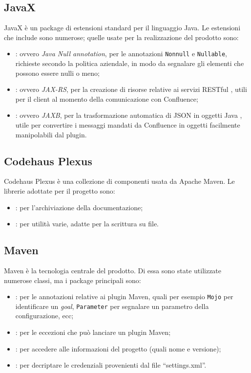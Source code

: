 \subsection{JavaX}
JavaX è un package di estensioni standard per il linguaggio Java.
Le estensioni che include sono numerose; quelle usate per la realizzazione del prodotto sono:
\begin{itemize}
    \item {}: ovvero \emph{Java Null annotation}, per le annotazioni  \texttt{Nonnull} e  \texttt{Nullable}, richieste secondo la politica aziendale, in modo da segnalare gli elementi che possono essere nulli o meno;
    \item {}: ovvero \emph{JAX-RS}, per la creazione di risorse relative ai servizi RESTful \cite{site:jax-rs}, utili per il client al momento della comunicazione con Confluence;
    \item {}: ovvero \emph{JAXB}, per la trasformazione automatica di JSON in oggetti Java \cite{site:jaxb}, utile per convertire i messaggi mandati da Confluence in oggetti facilmente manipolabili dal plugin.
\end{itemize}


\subsection{Codehaus Plexus}
Codehaus Plexus è una collezione di componenti usata da Apache Maven.
Le librerie adottate per il progetto sono:
\begin{itemize}
    \item {}: per l'archiviazione della documentazione;
    \item {}: per utilità varie, adatte per la scrittura su file.
\end{itemize}


\subsection{Maven}
Maven è la tecnologia centrale del prodotto.
Di essa sono state utilizzate numerose classi, ma i package principali sono:
\begin{itemize}
    \item {}: per le annotazioni relative ai plugin Maven, quali per esempio \texttt{Mojo} per identificare un \emph{goal},  \texttt{Parameter} per segnalare un parametro della configurazione, ecc;
    \item {}: per le eccezioni che può lanciare un plugin Maven;
    \item {}: per accedere alle informazioni del progetto (quali nome e versione);
    \item {}: per decriptare le credenziali provenienti dal file ``settings.xml''.
\end{itemize}


